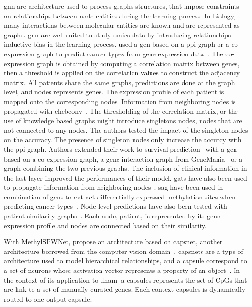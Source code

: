 \documentclass[../main.tex]{subfiles}
\begin{document}
	\Gls{gnn} are architecture used to process graphs structures, that impose constraints on relationships between node entities during the learning process.
	In biology, many interactions between molecular entities are known and are represented as graphs.
	\Gls{gnn} are well suited to study omics data by introducing relationships inductive bias in the learning process.
	\citeauthor{Ramirez2020} used a \gls{gcn} based on a \gls{ppi} graph or a co-expression graph to predict cancer types from gene expression data~\cite{Ramirez2020}.
	The co-expression graph is obtained by computing a correlation matrix between genes, then a threshold is applied on the correlation values to construct the adjacency matrix.
	All patients share the same graphs, predictions are done at the graph level, and nodes represents genes.
	The expression profile of each patient is mapped onto the corresponding nodes.
	Information from neighboring nodes is propagated with \gls{chebconv}~\cite{ChebConv}.
	The thresholding of the correlation matrix, or the use of knowledge based graphs might introduce singletons nodes, \ie{}nodes that are not connected to any nodes.
	The authors tested the impact of the singleton nodes on the accuracy.
	The presence of singleton nodes only increase the accurcy with the \gls{ppi} graph.
	Authors extended their work to survival prediction~\cite{Ramirez2021} with a \gls{gcn} based on a co-expression graph, a gene interaction graph from GeneMania~\cite{WardeFarley2010} or a graph combining the two previous graphs.
	The inclusion of clinical information in the last layer improved the performances of their model.
	\Glspl{gat} have also been used to propagate information from neighboring nodes~\cite{Xing2021}.
	\Gls{sag} have been used in combination of \glspl{gcn} to extract differentially expressed methylation sites when predicting cancer types~\cite{Jiang2023}.
	Node level predictions have also been tested with patient similarity graphs~\cite{Baul2022}.
	Each node, \ie{}patient, is represented by its gene expression profile and nodes are connected based on their similarity.

	\ifSubfilesClassLoaded{%
	}{
	}

	With MethylSPWNet, \citeauthor{levyMethylSPWNetMethylCapsNetBiologically2021a} propose an architecture based on \gls{capsnet}, another architecture borrowed from the computer vision domain~\cite{levyMethylSPWNetMethylCapsNetBiologically2021a}.
	\Glspl{capsnet} are a type of architecture used to model hierarchical relationships, and a capsule correspond to a set of neurons whose activation vector represents a property of an object~\cite{CapsNet}.
	In the context of its application to \gls{dnam}, a capsules represents the set of CpGs that are link to a set of manually curated genes.
	Each context capsules is dynamically routed to one output capsule.
\end{document}

